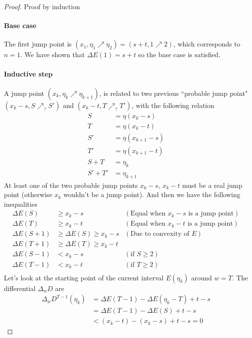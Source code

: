 \documentclass[]{article}
\begin{document}
\begin{proof}
		Proof by induction
	\paragraph{Base case}
	The first jump point is $(x_1, \eta_1\nearrow\eta_2) = (s+t, 1\nearrow2)$, which corresponds to $n = 1$. We have shown that $\Delta E(1) = s + t$ so the base case is satisfied.
	
	\paragraph{Inductive step} A jump point $(x_k, \eta_k\nearrow\eta_{k+1})$, is related to two previous ``probable jump point" $(x_k-s, S\nearrow_?S')$ and $(x_k-t, T\nearrow_?T')$, with the following relation
	\begin{align*}
	S &= \eta(x_k-s)\\
	T &= \eta(x_k-t)\\
	S' &= \eta(x_{k+1}-s)\\
	T' &= \eta(x_{k+1}-t)\\
	S + T &= \eta_k \\
	S' + T' &= \eta_{k+1}
	\end{align*}
	At least one of the two probable jump points $x_k-s$, $x_k-t$ must be a real jump point (otherwise $x_k$ wouldn't be a jump point). And then we have the following inequalities 
	\begin{align*}
	\Delta E(S) &\ge x_k - s &(\text{Equal when $x_k-s$ is a jump point}) \\
	\Delta E(T) &\ge x_k - t &(\text{Equal when $x_k-t$ is a jump point}) \\
	\Delta E(S+1) &\ge \Delta E(S) \ge x_k - s  &(\text{Due to convexity of $E$})\\
	\Delta E(T+1) &\ge \Delta E(T) \ge x_k - t \\
	\Delta E(S-1) &< x_k - s &(\text{if $S\ge 2$})\\
	\Delta E(T-1) &< x_k - t &(\text{if $T\ge 2$})\\
	\end{align*}
	Let's look at the starting point of the current interval $E(\eta_k)$ around $w = T$. The differential $\Delta_w D$ are
	\begin{align*}
	\Delta_w D^{T - 1}(\eta_k) &= \Delta E(T-1) - \Delta E(\eta_k - T) + t - s\\
	&= \Delta E(T-1) - \Delta E(S) + t - s\\
	&< (x_k - t) - (x_k - s) + t - s = 0

\end{align*}
\end{proof}
\end{document}
